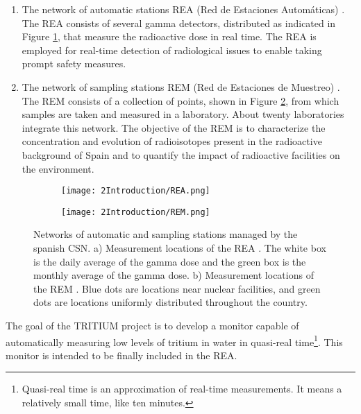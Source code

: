 \begin{enumerate}
\begin{enumerate}
\item{} The network of automatic stations REA (Red de Estaciones Automáticas) \cite{REA}. The REA consists of several gamma detectors, distributed as indicated in Figure \ref{subfig:REA}, that measure the radioactive dose in real time. The REA is employed for real-time detection of radiological issues to enable taking prompt safety measures.

\item{} The network of sampling stations REM (Red de Estaciones de Muestreo) \cite{REM}. The REM consists of a collection of points, shown in Figure \ref{subfig:REM}, from which samples are taken and measured in a laboratory. About twenty laboratories integrate this network. The objective of the REM is to characterize the concentration and evolution of radioisotopes present in the radioactive background of Spain and to quantify the impact of radioactive facilities on the environment.
\end{enumerate}

\begin{figure}
\centering
    \begin{subfigure}[b]{0.7\textwidth}
    \centering
    \texttt{[image: 2Introduction/REA.png]}  
        \caption{}\label{subfig:REA}
    \end{subfigure}
    \hfill
    \begin{subfigure}[b]{0.7\textwidth}
    \centering
    \texttt{[image: 2Introduction/REM.png]}  
    \caption{\label{subfig:REM}}
    \end{subfigure}
 \caption{Networks of automatic and sampling stations managed by the spanish CSN. a) Measurement locations of the REA \cite{REA}. The white box is the daily average of the gamma dose and the green box is the monthly average of the gamma dose. b) Measurement locations of the REM \cite{REM}. Blue dots are locations near nuclear facilities, and green dots are locations uniformly distributed throughout the country.}
 \label{fig:NetworksCSN}
\end{figure}


\end{enumerate}

The goal of the TRITIUM project is to develop a monitor capable of automatically measuring low levels of tritium in water in quasi-real time\footnote{Quasi-real time is an approximation of real-time measurements. It means a relatively small time, like ten minutes.}. This monitor is intended to be finally included in the REA.

